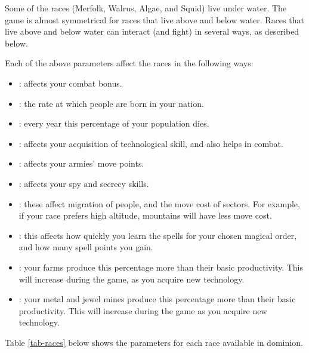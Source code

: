 Some of the races (Merfolk, Walrus, Algae, and Squid) live under
water.  The game is almost symmetrical for races that live above and
below water. Races that live above and below water can interact (and
fight) in several ways, as described below.

Each of the above parameters affect the races in the following ways:

\begin{itemize}
\item
{}: affects your combat bonus.
\item
{}: the rate at which people are born in your nation.
\item
{}: every year this percentage of your population dies.
\item
{}: affects your acquisition of technological skill,
and also helps in combat.
\item
{}: affects your armies' move points.
\item
{}: affects your spy and secrecy skills.
\item
{}: these affect
migration of people, and the move cost of sectors.  For example, if
your race prefers high altitude, mountains will have less move cost.
\item
{}: this affects how quickly you learn the spells for
your chosen magical order, and how many spell points you gain.
\item
{}: your farms produce this percentage more than their basic
productivity.  This will increase during the game, as you acquire new
technology.
\item
{}: your metal and jewel mines produce this percentage more than
their basic productivity.  This will increase during the game as you
acquire new technology.
\end{itemize}

Table \ref{tab-races} below shows the parameters for each race available
in dominion.

